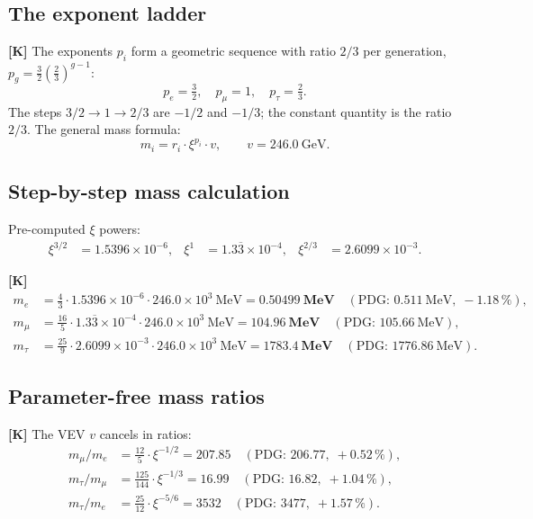 \subsection{The exponent ladder}

\textbf{[K]} The exponents $p_i$ form a geometric sequence with ratio
$2/3$ per generation, $p_g = \tfrac{3}{2}\left(\tfrac{2}{3}\right)^{g-1}$:
\begin{equation}
  p_e = \tfrac{3}{2},\quad p_\mu = 1,\quad p_\tau = \tfrac{2}{3}.
\end{equation}
The steps $3/2 \to 1 \to 2/3$ are $-1/2$ and $-1/3$; the constant
quantity is the ratio $2/3$. The general mass formula:
\begin{equation}
  m_i = r_i\cdot\xi^{p_i}\cdot v,\qquad v = 246.0~\text{GeV}.
  \label{eq:mass_lepton}
\end{equation}

\subsection{Step-by-step mass calculation}

Pre-computed $\xi$ powers:
\begin{align}
  \xi^{3/2} &= 1.5396\times10^{-6}, &
  \xi^{1}   &= 1.3\overline{3}\times10^{-4}, &
  \xi^{2/3} &= 2.6099\times10^{-3}.
\end{align}

\textbf{[K]}
\begin{align}
  m_e   &= \tfrac{4}{3}\cdot1.5396\times10^{-6}\cdot246.0\times10^3~\text{MeV}
         = \mathbf{0.50499}~\mathbf{MeV}
         \quad(\text{PDG: }0.511~\text{MeV},\;-1.18\,\%),\\
  m_\mu &= \tfrac{16}{5}\cdot1.3\overline{3}\times10^{-4}
           \cdot246.0\times10^3~\text{MeV}
         = \mathbf{104.96}~\mathbf{MeV}
         \quad(\text{PDG: }105.66~\text{MeV}),\\
  m_\tau&= \tfrac{25}{9}\cdot2.6099\times10^{-3}
           \cdot246.0\times10^3~\text{MeV}
         = \mathbf{1783.4}~\mathbf{MeV}
         \quad(\text{PDG: }1776.86~\text{MeV}).
\end{align}

\subsection{Parameter-free mass ratios}

\textbf{[K]} The VEV $v$ cancels in ratios:
\begin{align}
  m_\mu/m_e   &= \tfrac{12}{5}\cdot\xi^{-1/2} = 207.85
               \quad(\text{PDG: }206.77,\;+0.52\,\%),\\
  m_\tau/m_\mu &= \tfrac{125}{144}\cdot\xi^{-1/3} = 16.99
               \quad(\text{PDG: }16.82,\;+1.04\,\%),\\
  m_\tau/m_e   &= \tfrac{25}{12}\cdot\xi^{-5/6} = 3532
               \quad(\text{PDG: }3477,\;+1.57\,\%).
\end{align}

